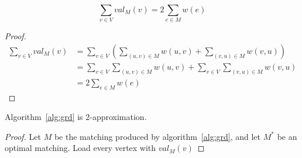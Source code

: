 \begin{lemma}
$$
\sum_{v \in V} val_M(v) = 2 \sum_{e \in M} w(e)
$$
\end{lemma}

\begin{proof}
\begin{equation}
\begin{split}
\sum_{v \in V} val_M(v)	& = 
\sum_{v \in V} \left( \sum_{(u, v) \in M} w(u, v) + \sum_{(v, u) \in M} w(v, u) \right)	\\
						& = \sum_{v \in V}\sum_{(u, v) \in M} w(u, v) + 
							\sum_{v \in V}\sum_{(v, u) \in M} w(v, u)					\\
						& = 2 \sum_{e \in M} w(e)
\end{split}
\end{equation}
\end{proof}

\begin{theorem}
Algorithm~\ref{alg:grd} is 2-approximation.
\end{theorem}

\begin{proof}
Let $M$ be the matching produced by algorithm~\ref{alg:grd}, 
and let $M^*$ be an optimal matching.
Load every vertex with $val_M(v)$
\end{proof}